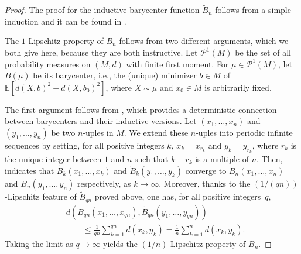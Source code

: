 \documentclass[10pt,a4paper]{article}
\theoremstyle{plain}
\theoremstyle{definition}
\theoremstyle{remark}
\newcommand{\E}{\mathbb{E}}
\begin{document}
\begin{proof}
The proof for the inductive barycenter function $\tilde B_n$ follows from a simple induction and it can be found in \cite[Lemma 3.1]{Funano10}.

The $1$-Lipschitz property of $B_n$ follows from two different arguments, which we both give here, because they are both instructive. Let $\mathcal P^1(M)$ be the set of all probability measures on $(M,d)$ with finite first moment. For $\mu\in\mathcal P^1(M)$, let $B(\mu)$ be its barycenter, i.e., the (unique) minimizer $b\in M$ of $\E[d(X,b)^2-d(X,b_0)^2]$, where $X\sim\mu$ and $x_0\in M$ is arbitrarily fixed. 

The first argument follows from \cite[Theorem 3.4]{LimPalfia14}, which provides a deterministic connection between barycenters and their inductive versions. Let $(x_1,\ldots,x_n)$ and $(y_1,\ldots,y_n)$ be two $n$-uples in $M$. We extend these $n$-uples into periodic infinite sequences by setting, for all positive integers $k$, $x_k=x_{r_k}$ and $y_k=y_{r_k}$, where $r_k$ is the unique integer between $1$ and $n$ such that $k-r_k$ is a multiple of $n$. Then, \cite[Theorem 3.4]{LimPalfia14} indicates that $\tilde B_k(x_1,\ldots,x_k)$ and $\tilde B_k(y_1,\ldots,y_k)$ converge to $B_n(x_1,\ldots,x_n)$ and $B_n(y_1,\ldots,y_n)$ respectively, as $k\to\infty$. Moreover, thanks to the $(1/(qn))$-Lipschitz feature of $\tilde B_{qn}$ proved above, one has, for all positive integers~$q$, 
\begin{align*}
& d(\tilde B_{qn}(x_1,\ldots,x_{qn}),\tilde B_{qn}(y_1,\ldots,y_{qn})) \\
& \quad \quad \leq \frac{1}{qn}\sum_{k=1}^{qn} d(x_k,y_k)=\frac{1}{n}\sum_{k=1}^{n} d(x_k,y_k).
\end{align*}
Taking the limit as $q\to\infty$ yields the $(1/n)$-Lipschitz property of $B_n$. 


\end{proof}
\end{document}
